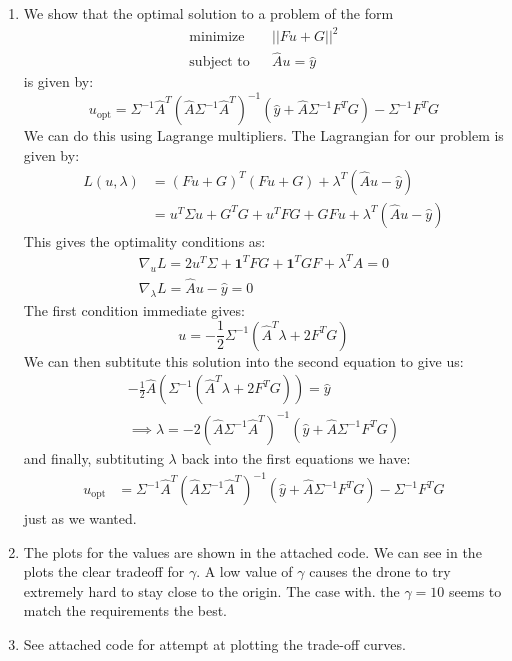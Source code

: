 \documentclass[12pt]{exam}
\begin{document}
\begin{questions}
\begin{solution}
\begin{enumerate}[label=(\alph*)]
      \item
        We show that the optimal solution to a problem of the form
        \begin{align*}
          \text{minimize} && ||Fu + G||^2  \\
          \text{subject to} && \hat{A}u = \hat{y}
        \end{align*}
        is given by:
        \[
          u_{\text{opt}} = \Sigma^{-1}\hat{A}^T(\hat{A}\Sigma^{-1}\hat{A}^T)^{-1}(\hat{y} + \hat{A}\Sigma^{-1}F^TG) - \Sigma^{-1}F^TG
        \]
        We can do this using Lagrange multipliers. The Lagrangian for our problem is given by:
        \begin{align*}
          L(u, \lambda) &= (Fu + G)^T(Fu + G) + \lambda^T(\hat{A}u - \hat{y}) \\
          &= u^T\Sigma u + G^TG + u^TFG + GFu + \lambda^T(\hat{A}u - \hat{y})
        \end{align*}
        This gives the optimality conditions as:
        \begin{align*}
          \nabla_{u} L = 2u^T\Sigma + \textbf{1}^T FG + \textbf{1}^T GF + \lambda^TA = 0  \\
          \nabla_{\lambda} L = \hat{A}u - \hat{y} = 0 
        \end{align*}
        The first condition immediate gives:
        \[
          u = -\frac{1}{2}\Sigma^{-1}(\hat{A}^T\lambda + 2F^TG)
        \]
        We can then subtitute this solution into the second equation to give us:
        \begin{align*}
          -\frac{1}{2}\hat{A}(\Sigma^{-1}(\hat{A}^T\lambda + 2F^TG)) = \hat{y} \\
          \implies \lambda = -2(\hat{A}\Sigma^{-1}\hat{A}^T)^{-1}(\hat{y} + \hat{A}\Sigma^{-1}F^TG)
        \end{align*}
        and finally, subtituting $\lambda$ back into the first equations we have:
        \begin{align*}
          u_{\text{opt}} &= \Sigma^{-1}\hat{A}^T(\hat{A}\Sigma^{-1}\hat{A}^T)^{-1}(\hat{y} + \hat{A}\Sigma^{-1}F^TG) - \Sigma^{-1}F^TG
        \end{align*}
        just as we wanted.
      \item The plots for the values are shown in the attached code. We can see in the plots the clear tradeoff for $\gamma$. A low value of $\gamma$ causes the drone to try extremely hard to stay close to the origin. The case with. the $\gamma = 10$ seems to match the requirements the best.
      \item See attached code for attempt at plotting the trade-off curves.
    \end{enumerate}
  \end{solution}



\end{questions}
\end{document}
